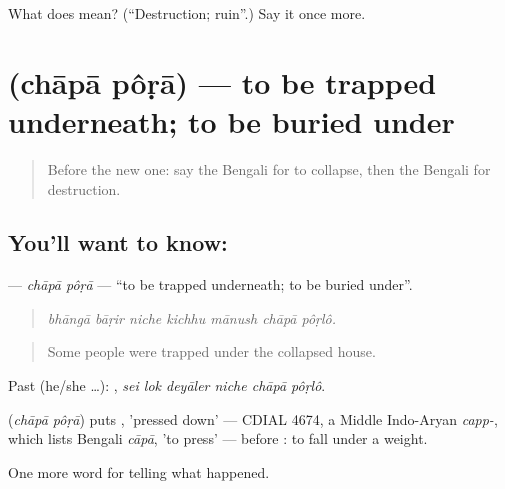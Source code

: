 \begin{tcolorbox}[breakable,colback=teal!4,colframe=teal!35!black,title={Before you move on}]
What does  mean? (\textquotedblleft{}Destruction; ruin\textquotedblright{}.) Say it once more.
\end{tcolorbox}
\section[\texorpdfstring{\bn{চাপা} \bn{পড়া} (chāpā pôṛā)}{চাপা পড়া (chāpā pôṛā)}]{  (chāpā pôṛā) — to be trapped underneath; to be buried under}

\label{lesson:BN-C293-chapa-pora}



\begin{quote}
Before the new one: say the Bengali for to collapse, then the Bengali for destruction.
\end{quote}

\subsection*{You'll want to know:  }
\textbf{ } — \emph{chāpā pôṛā} — \textquotedblleft{}to be trapped underneath; to be buried under\textquotedblright{}.

\begin{quote}
      
\end{quote}

\begin{quote}
\emph{bhāngā bāṛir niche kichhu mānush chāpā pôṛlô.}
\end{quote}

\begin{quote}
Some people were trapped under the collapsed house.
\end{quote}

Past (he/she …):      , \emph{sei lok deyāler niche chāpā pôṛlô}.

\begin{cousinweb}
\textbf{ } (\emph{chāpā pôṛā}) puts , 'pressed down' — CDIAL 4674, a Middle Indo-Aryan \emph{capp-}, which lists Bengali \emph{cāpā}, 'to press' — before : to fall under a weight.
\end{cousinweb}

\begin{grammarlens}[title={What you've built}]
One more word for telling what happened.
\end{grammarlens}


